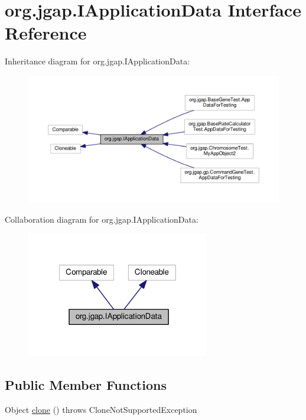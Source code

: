 \hypertarget{interfaceorg_1_1jgap_1_1_i_application_data}{\section{org.\-jgap.\-I\-Application\-Data Interface Reference}
\label{interfaceorg_1_1jgap_1_1_i_application_data}
}


Inheritance diagram for org.\-jgap.\-I\-Application\-Data\-:
\nopagebreak
\begin{figure}[H]
\begin{center}
\leavevmode
\includegraphics[width=350pt]{interfaceorg_1_1jgap_1_1_i_application_data__inherit__graph}
\end{center}
\end{figure}


Collaboration diagram for org.\-jgap.\-I\-Application\-Data\-:
\nopagebreak
\begin{figure}[H]
\begin{center}
\leavevmode
\includegraphics[width=226pt]{interfaceorg_1_1jgap_1_1_i_application_data__coll__graph}
\end{center}
\end{figure}
\subsection*{Public Member Functions}
\begin{DoxyCompactItemize}
\item 
Object \hyperlink{interfaceorg_1_1jgap_1_1_i_application_data_aaac67e57dd0ce01565bdae52944a667f}{clone} ()  throws Clone\-Not\-Supported\-Exception
\end{DoxyCompactItemize}
